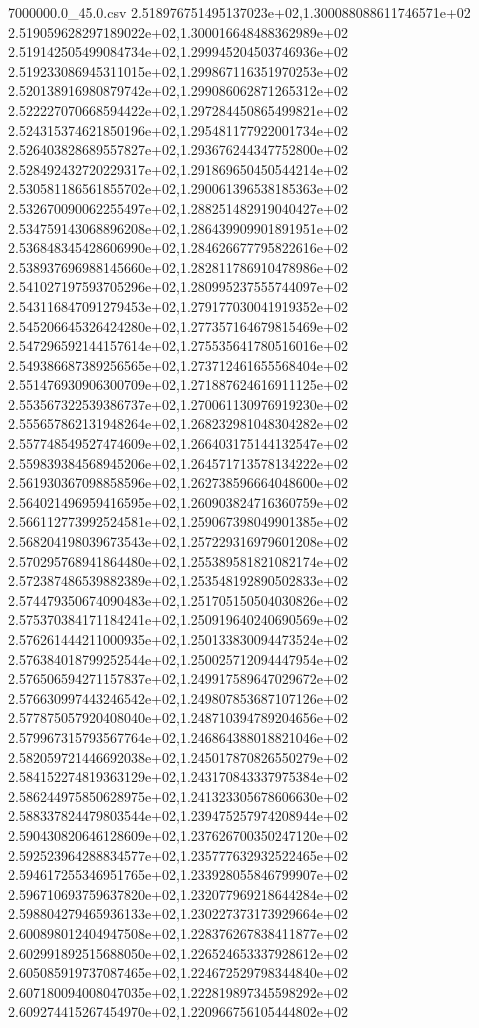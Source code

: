 \begin{filecontents*}{7000000.0_45.0.csv}
2.518976751495137023e+02,1.300088088611746571e+02
2.519059628297189022e+02,1.300016648488362989e+02
2.519142505499084734e+02,1.299945204503746936e+02
2.519233086945311015e+02,1.299867116351970253e+02
2.520138916980879742e+02,1.299086062871265312e+02
2.522227070668594422e+02,1.297284450865499821e+02
2.524315374621850196e+02,1.295481177922001734e+02
2.526403828689557827e+02,1.293676244347752800e+02
2.528492432720229317e+02,1.291869650450544214e+02
2.530581186561855702e+02,1.290061396538185363e+02
2.532670090062255497e+02,1.288251482919040427e+02
2.534759143068896208e+02,1.286439909901891951e+02
2.536848345428606990e+02,1.284626677795822616e+02
2.538937696988145660e+02,1.282811786910478986e+02
2.541027197593705296e+02,1.280995237555744097e+02
2.543116847091279453e+02,1.279177030041919352e+02
2.545206645326424280e+02,1.277357164679815469e+02
2.547296592144157614e+02,1.275535641780516016e+02
2.549386687389256565e+02,1.273712461655568404e+02
2.551476930906300709e+02,1.271887624616911125e+02
2.553567322539386737e+02,1.270061130976919230e+02
2.555657862131948264e+02,1.268232981048304282e+02
2.557748549527474609e+02,1.266403175144132547e+02
2.559839384568945206e+02,1.264571713578134222e+02
2.561930367098858596e+02,1.262738596664048600e+02
2.564021496959416595e+02,1.260903824716360759e+02
2.566112773992524581e+02,1.259067398049901385e+02
2.568204198039673543e+02,1.257229316979601208e+02
2.570295768941864480e+02,1.255389581821082174e+02
2.572387486539882389e+02,1.253548192890502833e+02
2.574479350674090483e+02,1.251705150504030826e+02
2.575370384171184241e+02,1.250919640240690569e+02
2.576261444211000935e+02,1.250133830094473524e+02
2.576384018799252544e+02,1.250025712094447954e+02
2.576506594271157837e+02,1.249917589647029672e+02
2.576630997443246542e+02,1.249807853687107126e+02
2.577875057920408040e+02,1.248710394789204656e+02
2.579967315793567764e+02,1.246864388018821046e+02
2.582059721446692038e+02,1.245017870826550279e+02
2.584152274819363129e+02,1.243170843337975384e+02
2.586244975850628975e+02,1.241323305678606630e+02
2.588337824479803544e+02,1.239475257974208944e+02
2.590430820646128609e+02,1.237626700350247120e+02
2.592523964288834577e+02,1.235777632932522465e+02
2.594617255346951765e+02,1.233928055846799907e+02
2.596710693759637820e+02,1.232077969218644284e+02
2.598804279465936133e+02,1.230227373173929664e+02
2.600898012404947508e+02,1.228376267838411877e+02
2.602991892515688050e+02,1.226524653337928612e+02
2.605085919737087465e+02,1.224672529798344840e+02
2.607180094008047035e+02,1.222819897345598292e+02
2.609274415267454970e+02,1.220966756105444802e+02

\end{filecontents*}
